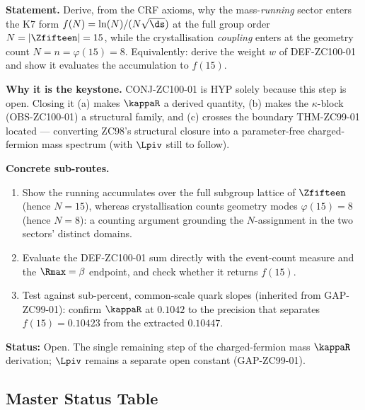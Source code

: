 \documentclass[12pt, a4paper]{article}
\begin{document}
\begin{openqbox}[title={GAP-ZC100-01: Derive the $N$-Assignment
  (Priority 1 --- the step that lifts CONJ-ZC100-01 from HYP to DER)}]
\textbf{Statement.} Derive, from the CRF axioms, why the mass-\emph{running}
sector enters the K7 form $f(N)=\ln(N)/(N\sqrt{\ds})$ at the full group order
$N=|\Zfifteen|=15$, while the crystallisation \emph{coupling} enters at the
geometry count $N=n=\varphi(15)=8$. Equivalently: derive the weight $w$ of
DEF-ZC100-01 and show it evaluates the accumulation to $f(15)$.

\textbf{Why it is the keystone.} CONJ-ZC100-01 is HYP solely because this step
is open. Closing it (a) makes $\kappaR$ a derived quantity, (b) makes the
$\kappa$-block (OBS-ZC100-01) a structural family, and (c) crosses the boundary
THM-ZC99-01 located --- converting ZC98's structural closure into a
parameter-free charged-fermion mass spectrum (with $\Lpiv$ still to follow).

\textbf{Concrete sub-routes.}
\begin{enumerate}[leftmargin=1.8em, noitemsep]
  \item Show the running accumulates over the full subgroup lattice of
    $\Zfifteen$ (hence $N=15$), whereas crystallisation counts geometry modes
    $\varphi(15)=8$ (hence $N=8$): a counting argument grounding the
    $N$-assignment in the two sectors' distinct domains.
  \item Evaluate the DEF-ZC100-01 sum directly with the event-count measure and
    the $\Rmax=\beta$ endpoint, and check whether it returns $f(15)$.
  \item Test against sub-percent, common-scale quark slopes (inherited from
    GAP-ZC99-01): confirm $\kappaR$ at $0.1042$ to the precision that separates
    $f(15)=0.10423$ from the extracted $0.10447$.
\end{enumerate}
\textbf{Status:} Open. The single remaining step of the charged-fermion mass
$\kappaR$ derivation; $\Lpiv$ remains a separate open constant (GAP-ZC99-01).
\end{openqbox}

\subsection{Master Status Table}
\end{document}
